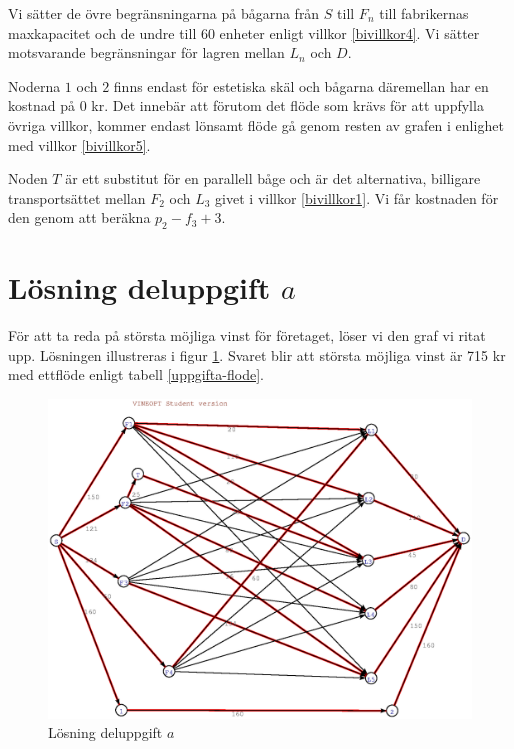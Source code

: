 \documentclass[titlepage, a4paper]{article}
\begin{document}
Vi sätter de övre begränsningarna på bågarna från $S$ till $F_{n}$ till fabrikernas maxkapacitet och de undre till 60 enheter enligt villkor \ref{bivillkor4}. Vi sätter motsvarande begränsningar för lagren mellan $L_{n}$ och $D$.

Noderna $1$ och $2$ finns endast för estetiska skäl och bågarna däremellan har en kostnad på 0 kr. Det innebär att förutom det flöde som krävs för att uppfylla övriga villkor, kommer endast lönsamt flöde gå genom resten av grafen i enlighet med villkor \ref{bivillkor5}.

Noden $T$ är ett substitut för en parallell båge och är det alternativa, billigare transportsättet mellan $F_{2}$ och $L_{3}$ givet i villkor \ref{bivillkor1}. Vi får kostnaden för den genom att beräkna $p_{2}-f_{3}+3$.

\section{Lösning deluppgift $a$}

För att ta reda på största möjliga vinst för företaget, löser vi den graf vi ritat upp. Lösningen illustreras i figur \ref{uppgifta-losning}. Svaret blir att största möjliga vinst är 715 kr med ettflöde enligt tabell \ref{uppgifta-flode}.

\begin{figure}[h!]
\centerline{\includegraphics[scale=0.65]{laborationsuppgift_13a_solved.ps}}
\caption{Lösning deluppgift $a$} \label{uppgifta-losning}
\end{figure}
\end{document}
